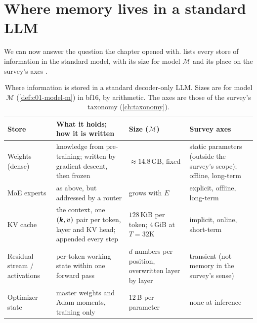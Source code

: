 \section{Where memory lives in a standard LLM}\label{sec:c01-where-memory}

We can now answer the question the chapter opened with.  lists
every store of information in the standard model, with its size for model $\mathcal{M}$ and
its place on the survey's axes \citep{zhoubian2026memory}.

\begin{table}[t]
\centering
\caption{Where information is stored in a standard decoder-only LLM. Sizes are for model
$\mathcal{M}$ (\cref{def:c01-model-m}) in bf16, by arithmetic. The axes are those of the
survey's taxonomy (\cref{ch:taxonomy}).}
\label{tab:c01-where-memory}
\small
\begin{tabularx}{\textwidth}{@{}>{\raggedright\arraybackslash}p{2.2cm}>{\raggedright\arraybackslash}X>{\raggedright\arraybackslash}p{2.6cm}>{\raggedright\arraybackslash}p{3.6cm}@{}}
\toprule
Store & What it holds; how it is written & Size ($\mathcal{M}$) & Survey axes\\
\midrule
Weights (dense) & knowledge from pre-training; written by gradient descent, then frozen & $\approx 14.8$\,GB, fixed & static parameters (outside the survey's scope); offline, long-term\\
MoE experts & as above, but addressed by a router & grows with $E$ & explicit, offline, long-term\\
KV cache & the context, one $(\bm{k}, \bm{v})$ pair per token, layer and KV head; appended every step & $128$\,KiB per token; $4$\,GiB at $T = 32$K & implicit, online, short-term\\
Residual stream / activations & per-token working state within one forward pass & $d$ numbers per position, overwritten layer by layer & transient (not memory in the survey's sense)\\
Optimizer state & master weights and Adam moments, training only & $12$\,B per parameter & none at inference\\
\bottomrule
\end{tabularx}
\end{table}

